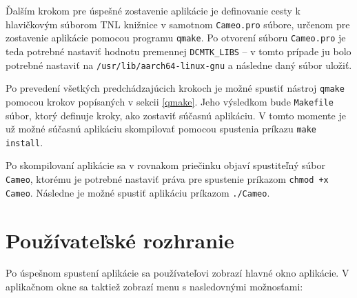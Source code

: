 {Ďalším krokom pre úspešné zostavenie aplikácie je definovanie cesty k hlavičkovým súborom TNL knižnice v samotnom \texttt{Cameo.pro} súbore, určenom pre zostavenie aplikácie pomocou programu \texttt{qmake}. Po otvorení súboru \texttt{Cameo.pro} je teda potrebné nastaviť hodnotu premennej \lstinline{DCMTK_LIBS} -- v tomto prípade ju bolo potrebné nastaviť na \texttt{/usr/lib/aarch64-linux-gnu} a následne daný súbor uložiť.

Po prevedení všetkých predchádzajúcich krokoch je možné spustiť nástroj \texttt{qmake} pomocou krokov popísaných v sekcii \ref{qmake}. Jeho výsledkom bude \texttt{Makefile} súbor, ktorý definuje kroky, ako zostaviť súčasnú aplikáciu. V tomto momente je už možné súčasnú aplikáciu skompilovať pomocou spustenia príkazu \texttt{make install}.

Po skompilovaní aplikácie sa v rovnakom priečinku objaví spustiteľný súbor \texttt{Cameo}, ktorému je potrebné nastaviť práva pre spustenie príkazom \texttt{chmod +x Cameo}. Následne je možné spustiť aplikáciu príkazom \texttt{./Cameo}. \clearpage

\section {Používateľské rozhranie}\label{old_ui}

Po úspešnom spustení aplikácie sa používateľovi zobrazí hlavné okno aplikácie.
V aplikačnom okne sa taktiež zobrazí menu s nasledovnými možnosťami:

}
